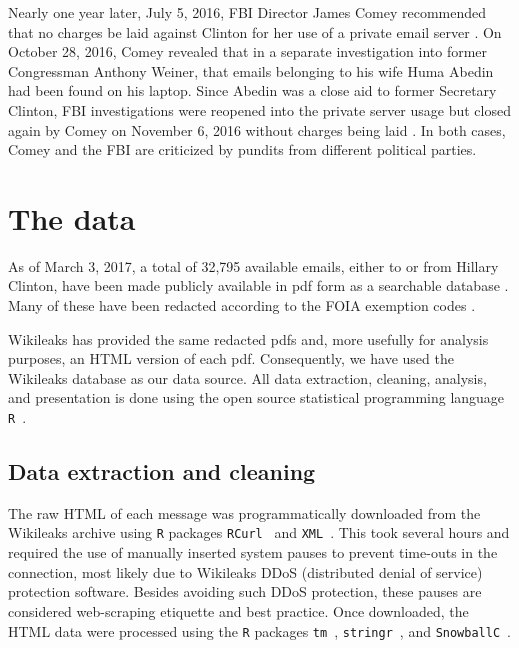 \documentclass[journal]{vgtc}                %
\begin{document}
Nearly one year later, July 5, 2016,  FBI Director James Comey recommended that no charges be laid against Clinton for her use of a private email server \cite{nochargeFBI}.  On October 28, 2016, Comey revealed that in a separate investigation into former Congressman Anthony Weiner, that emails belonging to his wife Huma Abedin had been found on his laptop.  Since Abedin was a close aid to former Secretary Clinton, FBI investigations were reopened into the private server usage but closed again by Comey on November 6, 2016 without charges being laid \cite{nochargeFBINov}.  In both cases, Comey and the FBI are criticized by pundits from different political parties.

\section{The data}
\label{sect:data}
As of March 3, 2017, a total of 32,795 available emails, either to or from Hillary Clinton, have been made publicly available in pdf form as a searchable database \cite{StateDeptFOIA}.  Many of these have been redacted according to the FOIA exemption codes \cite{FOIA}.  

Wikileaks \cite{Wikileaks} has provided the same redacted pdfs and, more usefully for analysis purposes, an HTML version of each pdf.  Consequently, we have used the Wikileaks database as our data source.   All data extraction, cleaning, analysis, and presentation is done using the open source statistical programming language \texttt{R}~\cite{Rsystem}.

\subsection{Data extraction and cleaning}
\label{sect:data:extrclean}
The raw HTML of each message was programmatically downloaded from the Wikileaks archive using \texttt{R} packages  \texttt{RCurl}~\cite{RCurl2016package} and \texttt{XML}~\cite{XML2016package}.  This took several hours and required the use of manually inserted system pauses to prevent time-outs in the connection, most likely due to Wikileaks DDoS (distributed denial of service) protection software. Besides avoiding such DDoS protection, these pauses are considered web-scraping etiquette and best practice.
Once downloaded, the HTML data were processed using the \texttt{R} packages \texttt{tm}~\cite{tm2008paper, tm2017package}, \texttt{stringr}~\cite{stringr2016package}, and \texttt{SnowballC}~\cite{snowballc2014package}.   
\end{document}
